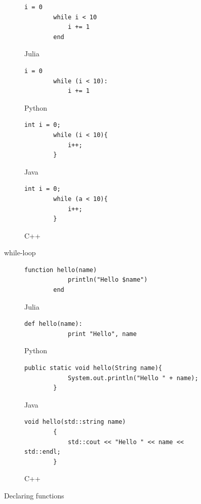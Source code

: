 \documentclass[a4paper, 11pt, titlepage]{article}
\begin{document}
\begin{figure}[H]
	\centering
	\begin{subfigure}[H]{0.7\textwidth}
		\centering
		\begin{lstlisting}[belowskip=0.5mm]
		i = 0
		while i < 10
			i += 1
		end
		\end{lstlisting}
		\caption{Julia}
	\end{subfigure}
	\begin{subfigure}[H]{0.7\textwidth}
		\centering
		\begin{lstlisting}[belowskip=0.5mm]
		i = 0
		while (i < 10):
			i += 1
		\end{lstlisting}
		\caption{Python}
	\end{subfigure}	
	\begin{subfigure}[H]{0.7\textwidth}
		\centering
		\begin{lstlisting}[belowskip=0.5mm]
		int i = 0;
		while (i < 10){
			i++;
		}
		\end{lstlisting}
		\caption{Java}
	\end{subfigure}
	\begin{subfigure}[H]{0.7\textwidth}
		\centering
		\begin{lstlisting}[belowskip=0.5mm]
		int i = 0;
		while (a < 10){
			i++;
		}
		\end{lstlisting}
		\caption{C++}
	\end{subfigure}
	\caption{while-loop}
	\label{whileloop}
\end{figure}

\begin{figure}[H]
	\centering
	\begin{subfigure}[H]{0.7\textwidth}
		\centering
		\begin{lstlisting}[belowskip=0.5mm]
		function hello(name)
			println("Hello $name")
		end
		\end{lstlisting}
		\caption{Julia}
	\end{subfigure}
	\begin{subfigure}[H]{0.7\textwidth}
		\centering
		\begin{lstlisting}[belowskip=0.5mm]
		def hello(name):
			print "Hello", name
		\end{lstlisting}
		\caption{Python}
	\end{subfigure}	
	\begin{subfigure}[H]{0.7\textwidth}
		\centering
		\begin{lstlisting}[belowskip=0.5mm]
		public static void hello(String name){
			System.out.println("Hello " + name);
		}
		\end{lstlisting}
		\caption{Java}
	\end{subfigure}
	\begin{subfigure}[H]{0.7\textwidth}
		\centering
		\begin{lstlisting}[belowskip=0.5mm]
		void hello(std::string name)
		{
			std::cout << "Hello " << name << std::endl;
		}
		\end{lstlisting}
		\caption{C++}
	\end{subfigure}
	\caption{Declaring functions}
	\label{function}
\end{figure}
\end{document}
